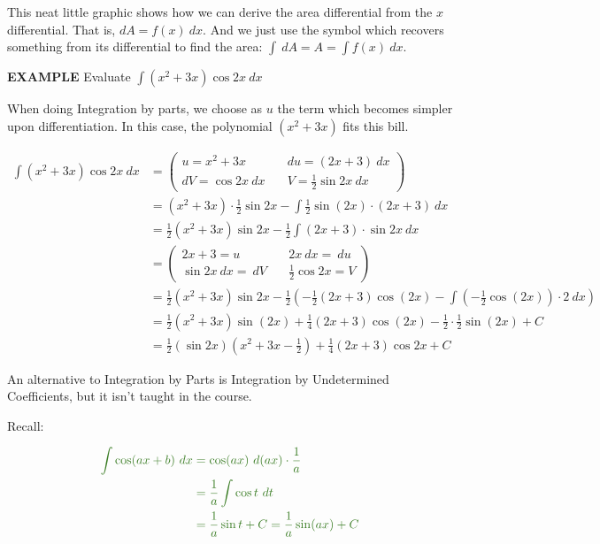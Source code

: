\documentclass{article}
\begin{document}
\vspace{10pt}

This neat little graphic shows how we can derive the area differential from the $x$ differential. That is, $dA=f(x)\ dx$. And we just use the symbol which recovers something from its differential to find the area: $\int\ dA=A=\int f(x)\ dx$.

\vspace{10pt}

{\bf{}EXAMPLE} Evaluate $\displaystyle\int(x^2+3x)\cos2x\ dx$

\vspace{10pt}

When doing Integration by parts, we choose as $u$ the term which becomes simpler upon differentiation. In this case, the polynomial $(x^2+3x)$ fits this bill.

\begin{align*}
\int(x^2+3x)\cos2x\ dx&=\left(\begin{aligned}u=x^2+3x&\quad du=(2x+3)\ dx\\dV=\cos2x\ dx&\quad V=\frac{1}{2}\sin2x\ dx\end{aligned}\right)\\
&=(x^2+3x)\cdot\frac{1}{2}\sin2x-\int\frac{1}{2}\sin(2x)\cdot(2x+3)\ dx\\
&=\frac{1}{2}(x^2+3x)\sin2x-\frac{1}{2}\int(2x+3)\cdot\sin2x\ dx\\
&=\left(\begin{aligned}2x+3=u&\quad2x\ dx=\ du\\\sin2x\ dx=\ dV&\quad\frac{1}{2}\cos2x=V\end{aligned}\right)\\
&=\frac{1}{2}(x^2+3x)\sin2x-\frac{1}{2}\left(-\frac{1}{2}(2x+3)\cos(2x)-\int\left(-\frac{1}{2}\cos(2x)\right)\cdot2\ dx\right)\\
&=\frac{1}{2}(x^2+3x)\sin(2x)+\frac{1}{4}(2x+3)\cos(2x)-\frac{1}{2}\cdot\frac{1}{2}\sin(2x)+C\\
&=\frac{1}{2}(\sin2x)(x^2+3x-\frac{1}{2})+\frac{1}{4}(2x+3)\cos2x+C
\end{align*}

\vspace{10pt}

An alternative to Integration by Parts is Integration by Undetermined Coefficients, but it isn't taught in the course.

\vspace{10pt}

Recall:

\begin{align*}
\color{OliveGreen}\int\cos(ax+b)\ dx&\color{OliveGreen}=\cos(ax)\ d(ax)\cdot\frac{1}{a}\\
&\color{OliveGreen}=\frac{1}{a}\int\cos t\ dt\\
&\color{OliveGreen}=\frac{1}{a}\sin t+C=\frac{1}{a}\sin(ax)+C
\end{align*}
\end{document}
